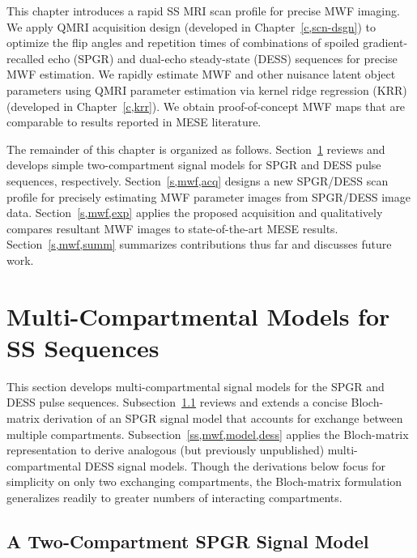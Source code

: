 This chapter introduces
a rapid SS MRI scan profile
for precise MWF imaging.
We apply QMRI acquisition design
(developed in Chapter~\ref{c,scn-dsgn})
to optimize the flip angles and repetition times
of combinations 
of spoiled gradient-recalled echo (SPGR)
\cite{zur:91:sot}
and dual-echo steady-state (DESS) 
\cite{redpath:88:fan, bruder:88:ans} sequences
for precise MWF estimation.
We rapidly estimate MWF and 
other nuisance latent object parameters
using QMRI parameter estimation
via kernel ridge regression (KRR)
(developed in Chapter~\ref{c,krr}).
We obtain proof-of-concept MWF maps \invivo
that are comparable
to results reported
in MESE literature.

The remainder of this chapter
is organized as follows.
Section~\ref{s,mwf,model} reviews and develops
simple two-compartment signal models
for SPGR and DESS pulse sequences, 
respectively.
Section~\ref{s,mwf,acq} designs 
a new SPGR/DESS scan profile 
for precisely estimating MWF parameter images
from SPGR/DESS image data.
Section~\ref{s,mwf,exp} applies
the proposed acquisition \invivo
and qualitatively compares resultant MWF images
to state-of-the-art MESE results.
Section~\ref{s,mwf,summ} summarizes contributions thus far
and discusses future work. 

\section{Multi-Compartmental Models for SS Sequences}
\label{s,mwf,model}

This section develops multi-compartmental signal models
for the SPGR and DESS pulse sequences.
Subsection~\ref{ss,mwf,model,spgr} reviews and extends
a concise Bloch-matrix derivation \cite{spencer:00:mos}
of an SPGR signal model 
that accounts for exchange 
between multiple compartments.
Subsection~\ref{ss,mwf,model,dess} applies 
the Bloch-matrix representation
to derive analogous 
(but previously unpublished)
multi-compartmental DESS signal models. 
Though the derivations below
focus for simplicity
on only two exchanging compartments,
the Bloch-matrix formulation generalizes readily
to greater numbers of interacting compartments.

\subsection{A Two-Compartment SPGR Signal Model}
\label{ss,mwf,model,spgr}


